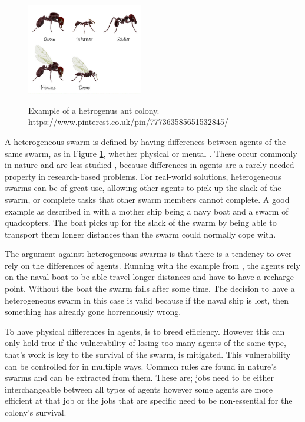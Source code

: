 \documentclass{UoYCSproject}
\begin{document}
\begin{figure}[htb]
\begin{center}
\label{fig:anthero}
\includegraphics[height=4cm]{"./ExplanationImgs/AntHetro.png"}
\end{center}
\caption{Example of a hetrogenus ant colony. https://www.pinterest.co.uk/pin/777363585651532845/}
\end{figure}

A heterogeneous swarm is defined by having differences between agents of the same swarm, as in Figure \ref{fig:anthero}, whether physical or mental \cite{Swarm robotics reviewed, Swarm intellegiegence}. 
These occur commonly in nature and are less studied \cite{Swarm intellegiegence}, because differences in agents are a rarely needed property in research-based problems. 
For real-world solutions, heterogeneous swarms can be of great use, allowing other agents to pick up the slack of the swarm, or complete tasks that other swarm members cannot complete. 
A good example as described in \cite{Swarm robotics reviewed} with a mother ship being a navy boat and a swarm of quadcopters. 
The boat picks up for the slack of the swarm by being able to transport them longer distances than the swarm could normally cope with.

The argument against heterogeneous swarms is that there is a tendency to over rely on the differences of agents. 
Running with the example from \cite{Swarm robotics reviewed}, the agents rely on the naval boat to be able travel longer distances and have to have a recharge point. 
Without the boat the swarm fails after some time. 
The decision to have a heterogeneous swarm in this case is valid because if the naval ship is lost, then something has already gone horrendously wrong.

To have physical differences in agents, is to breed efficiency. 
However this can only hold true if the vulnerability of losing too many agents of the same type, that’s work is key to the survival of the swarm, is mitigated. 
This vulnerability can be controlled for in multiple ways. 
Common rules are found in nature's swarms and can be extracted from them. 
These are; jobs need to be either interchangeable between all types of agents however some agents are more efficient at that job \cite{Ant communication} or the jobs that are specific need to be non-essential for the colony's survival. 
\end{document}
